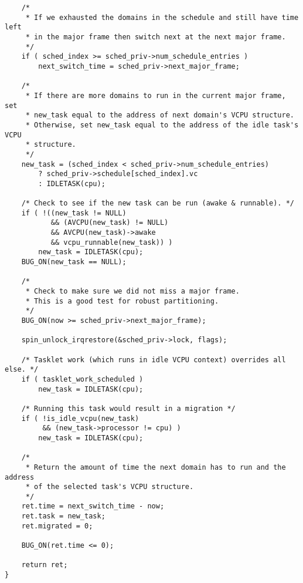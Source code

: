 \begin{lstlisting}
    /*
     * If we exhausted the domains in the schedule and still have time left
     * in the major frame then switch next at the next major frame.
     */
    if ( sched_index >= sched_priv->num_schedule_entries )
        next_switch_time = sched_priv->next_major_frame;

    /*
     * If there are more domains to run in the current major frame, set
     * new_task equal to the address of next domain's VCPU structure.
     * Otherwise, set new_task equal to the address of the idle task's VCPU
     * structure.
     */
    new_task = (sched_index < sched_priv->num_schedule_entries)
        ? sched_priv->schedule[sched_index].vc
        : IDLETASK(cpu);

    /* Check to see if the new task can be run (awake & runnable). */
    if ( !((new_task != NULL)
           && (AVCPU(new_task) != NULL)
           && AVCPU(new_task)->awake
           && vcpu_runnable(new_task)) )
        new_task = IDLETASK(cpu);
    BUG_ON(new_task == NULL);

    /*
     * Check to make sure we did not miss a major frame.
     * This is a good test for robust partitioning.
     */
    BUG_ON(now >= sched_priv->next_major_frame);

    spin_unlock_irqrestore(&sched_priv->lock, flags);

    /* Tasklet work (which runs in idle VCPU context) overrides all else. */
    if ( tasklet_work_scheduled )
        new_task = IDLETASK(cpu);

    /* Running this task would result in a migration */
    if ( !is_idle_vcpu(new_task)
         && (new_task->processor != cpu) )
        new_task = IDLETASK(cpu);

    /*
     * Return the amount of time the next domain has to run and the address
     * of the selected task's VCPU structure.
     */
    ret.time = next_switch_time - now;
    ret.task = new_task;
    ret.migrated = 0;

    BUG_ON(ret.time <= 0);

    return ret;
}
\end{lstlisting}

